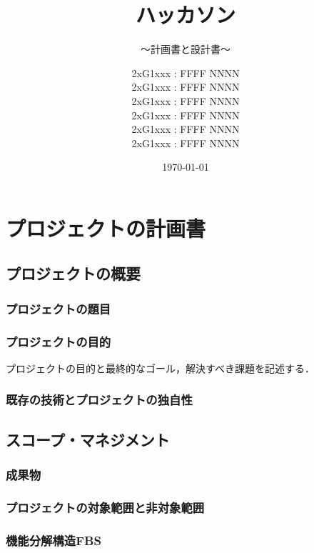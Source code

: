 \documentclass[lualatex,book,paper=a4paper,jafontsize=11.5pt,jafontscale=1.05]{jlreq}
\title{ハッカソン}
\subtitle{～計画書と設計書～}
\author{
	2xG1xxx : FFFF NNNN\\
        2xG1xxx : FFFF NNNN\\
	2xG1xxx : FFFF NNNN\\
        2xG1xxx : FFFF NNNN\\
        2xG1xxx : FFFF NNNN\\
        2xG1xxx : FFFF NNNN
        }
\date{\today}
\begin{document}
\maketitle

\setcounter{tocdepth}{2}
\tableofcontents \thispagestyle{empty}

\chapter{プロジェクトの計画書} \label{chap:project-plan}\setcounter{page}{1}


\section{プロジェクトの概要}
\subsection{プロジェクトの題目}

\subsection{プロジェクトの目的}
プロジェクトの目的と最終的なゴール，解決すべき課題を記述する．

\subsection{既存の技術とプロジェクトの独自性}

\section{スコープ・マネジメント}
\subsection{成果物}

\subsection{プロジェクトの対象範囲と非対象範囲}

\subsection{機能分解構造FBS}
\end{document}
